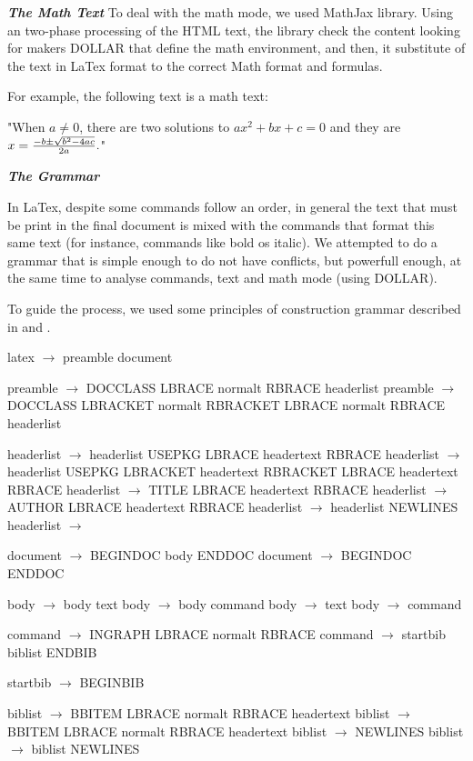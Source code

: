 \documentclass{article}
\begin{document}
\textit{\textbf{The Math Text}}
To deal with the math mode, we used MathJax library. Using an two-phase processing of the HTML text, the library check the content looking for makers DOLLAR that define the math environment, and then, it substitute of the text in LaTex format to the correct Math format and formulas.

For example, the following text is a math text:

"When $a \ne 0$, there are two solutions to $ax^2 + bx + c = 0$ and they are $x = {-b \pm \sqrt{b^2-4ac} \over 2a}.$"

\textit{\textbf{The Grammar}}

In LaTex, despite some commands follow an order, in general the text that must be print in the final document is mixed with the commands that format this same text (for instance, commands like bold os italic). We attempted to do a grammar that is simple enough to do not have conflicts, but powerfull enough, at the same time to analyse commands, text and math mode (using DOLLAR).

To guide the process, we used some principles of construction grammar described in \cite{Appel02} and \cite{Aho86}.

latex $\rightarrow$ preamble document

preamble $\rightarrow$ DOCCLASS LBRACE normalt RBRACE headerlist 
preamble $\rightarrow$ DOCCLASS LBRACKET normalt RBRACKET LBRACE normalt RBRACE headerlist

headerlist $\rightarrow$ headerlist USEPKG LBRACE headertext RBRACE
headerlist $\rightarrow$ headerlist USEPKG LBRACKET headertext RBRACKET LBRACE headertext RBRACE
headerlist $\rightarrow$ TITLE LBRACE headertext RBRACE
headerlist $\rightarrow$ AUTHOR LBRACE headertext RBRACE
headerlist $\rightarrow$ headerlist NEWLINES
headerlist $\rightarrow$

document $\rightarrow$ BEGINDOC body ENDDOC
document $\rightarrow$ BEGINDOC ENDDOC

body $\rightarrow$ body text
body $\rightarrow$ body command
body $\rightarrow$ text
body $\rightarrow$ command

command $\rightarrow$ INGRAPH LBRACE normalt RBRACE
command $\rightarrow$ startbib biblist ENDBIB

startbib $\rightarrow$ BEGINBIB

biblist $\rightarrow$  BBITEM LBRACE normalt RBRACE headertext
biblist $\rightarrow$ BBITEM LBRACE normalt RBRACE headertext
biblist $\rightarrow$ NEWLINES
biblist $\rightarrow$ biblist NEWLINES
\end{document}
